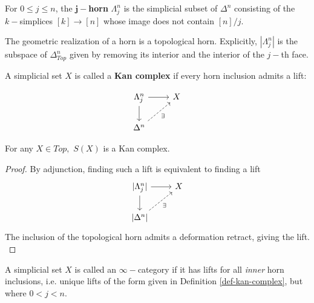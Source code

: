 \begin{definition}
    For $0\leq j \leq n$, the $\mathbf{j-}$\textbf{horn} $\Lambda^n_j$ is the simplicial subset of $\Delta^n$ consisting of the $k-$simplices $[k]\rightarrow [n]$ whose image does not contain $[n]/j$.
\end{definition}

\begin{remark}
    The geometric realization of a horn is a topological horn. Explicitly, $|\Lambda^n_j|$ is the subspace of $\Delta^n_{Top}$ given by removing its interior and the interior of the $j-$th face.
\end{remark}

\begin{definition}\label{def-kan-complex}
    A simplicial set $X$ is called a \textbf{Kan complex} if every horn inclusion admits a lift:

\[\begin{tikzcd}
\Lambda^n_j \arrow[r] \arrow[d]         & X \\
\Delta^n \arrow[ru, "\exists"', dashed] &  
\end{tikzcd}\]
\end{definition}

\begin{proposition}
    For any $X\in Top,$ $S(X)$ is a Kan complex.
\end{proposition}
\begin{proof}
By adjunction, finding such a lift is equivalent to finding a lift
\[\begin{tikzcd}
\vert\Lambda^n_j\vert \arrow[r] \arrow[d]         &  X \\
\vert\Delta^n\vert \arrow[ru, "\exists"', dashed] &    
\end{tikzcd}\]
The inclusion of the topological horn admits a deformation retract, giving the lift. \cite{Land}
\end{proof}

\begin{definition}\label{def:infinity-category}
    A simplicial set $X$ is called an $\infty-$category if it has lifts for all \textit{inner} horn inclusions, i.e. unique lifts of the form given in Definition \ref{def-kan-complex}, but where $0<j<n$.
\end{definition}

